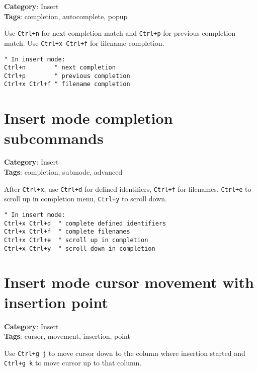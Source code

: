 {{{{{{\textbf{Category}: Insert\\ \textbf{Tags}: completion, autocomplete, popup
\vspace{0.5cm}

Use {\footnotesize \Verb§Ctrl+n§} for next completion match and {\footnotesize \Verb§Ctrl+p§} for previous completion match. Use {\footnotesize \Verb§Ctrl+x Ctrl+f§} for filename completion.

\begin{Exa*}{}
\begin{Verbatim}[fontsize=\footnotesize, breaklines, breakanywhere]
" In insert mode:
Ctrl+n        " next completion
Ctrl+p        " previous completion
Ctrl+x Ctrl+f " filename completion
\end{Verbatim}
\end{Exa*}

\section{Insert mode completion subcommands}

\textbf{Category}: Insert\\ \textbf{Tags}: completion, submode, advanced
\vspace{0.5cm}

After {\footnotesize \Verb§Ctrl+x§}, use {\footnotesize \Verb§Ctrl+d§} for defined identifiers, {\footnotesize \Verb§Ctrl+f§} for filenames, {\footnotesize \Verb§Ctrl+e§} to scroll up in completion menu, {\footnotesize \Verb§Ctrl+y§} to scroll down.

\begin{Exa*}{}
\begin{Verbatim}[fontsize=\footnotesize, breaklines, breakanywhere]
" In insert mode:
Ctrl+x Ctrl+d  " complete defined identifiers  
Ctrl+x Ctrl+f  " complete filenames
Ctrl+x Ctrl+e  " scroll up in completion
Ctrl+x Ctrl+y  " scroll down in completion
\end{Verbatim}
\end{Exa*}

\section{Insert mode cursor movement with insertion point}

\textbf{Category}: Insert\\ \textbf{Tags}: cursor, movement, insertion, point
\vspace{0.5cm}

Use {\footnotesize \Verb§Ctrl+g j§} to move cursor down to the column where insertion started and {\footnotesize \Verb§Ctrl+g k§} to move cursor up to that column.

}}}}}}
